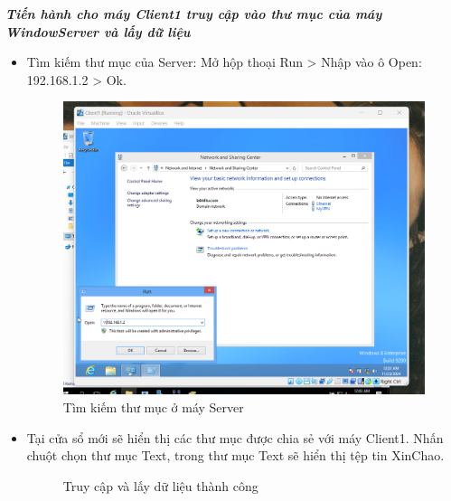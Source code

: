 \textbf{\textit{Tiến hành cho máy Client1 truy cập vào thư mục của máy WindowServer và lấy dữ liệu}}
 
\begin{itemize}
      \item Tìm kiếm thư mục của Server: Mở hộp thoại Run > Nhập vào ô Open: \\192.168.1.2 > Ok.

    \begin{figure}[htbp]
        \centering
        \includegraphics[width=0.6\linewidth]{RemoteAccessVPNimg/FindFile.png}
        \caption{Tìm kiếm thư mục ở máy Server}
    \end{figure}
      
    \item Tại cửa sổ mới sẽ hiển thị các thư mục được chia sẻ với máy Client1. Nhấn chuột chọn thư mục Text, trong thư mục Text sẽ hiển thị tệp tin XinChao. 

     \begin{figure}[htbp]
            \hfill
            \hfill
            \caption{Truy cập và lấy dữ liệu thành công}
        \end{figure}
 \end{itemize}

